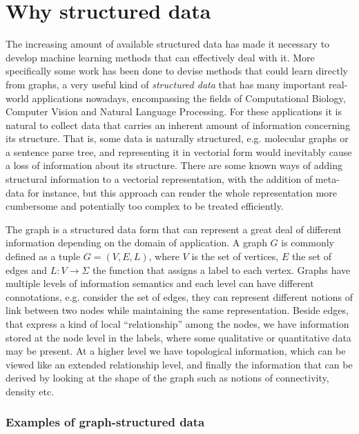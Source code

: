 \section{Why structured data}
\label{sec:why}

The increasing amount of available structured data has made it necessary to develop
machine learning methods that can effectively deal with it.
More specifically some work has been done to devise methods that could learn
directly from graphs, a very useful kind of \emph{structured data} that has many
important real-world applications nowadays, encompassing the fields of Computational
Biology, Computer Vision and Natural Language Processing.
For these applications it is natural to collect data that carries an inherent
amount of information concerning its structure.
That is, some data is naturally structured, e.g. molecular graphs or a sentence parse tree,
and representing it in vectorial form would inevitably cause a loss of information about
its structure.
There are some known ways of adding structural information to a vectorial representation,
with the addition of meta-data for instance, but this approach can render the
whole representation more cumbersome and potentially too complex to be treated
efficiently.

The graph is a structured data form that can represent a great deal of different
information depending on the domain of application.
A graph $G$ is commonly defined as a tuple $G=(V,E,L)$, where $V$
is the set of vertices, $E$ the set of edges and $L:V\to\Sigma$ the function that
assigns a label to each vertex.
Graphs have multiple levels of information semantics and each level can have
different connotations, e.g. consider the set of edges, they can represent
different notions of link between two nodes while maintaining the same
representation.
Beside edges, that express a kind of local ``relationship''
among the nodes, we have information stored at the node level in the
labels, where some qualitative or quantitative data may be present.
At a higher level we have topological information, which can be
viewed like an extended relationship level, and finally the information that can
be derived by looking at the shape of the graph such as notions
of connectivity, density etc.

\subsubsection{Examples of graph-structured data}
\label{subsubsec:examples}

